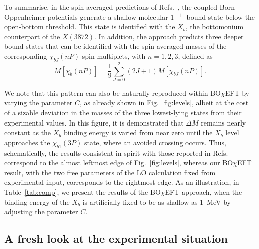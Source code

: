 \documentclass[aps,prd,showpacs,amsmath,twocolumn,superscriptaddress,floatfix,nofootinbib,notitlepage]{revtex4-2}
\newcommand{\be}{\begin{equation}}
\newcommand{\ee}{\end{equation}}
\newcommand{\X}{X(3872)}
\newcommand{\Xb}{X_b}
\newcommand{\BOchiEFT}{BO$\chi$EFT\xspace}
\begin{document}
To summarise, in the spin-averaged predictions of Refs.~\cite{Brambilla:2024imu,Brambilla:2026zfw,Brambilla:2026jqz}, the coupled Born--Oppenheimer potentials generate a shallow molecular $1^{++}$ bound state below the open-bottom threshold. This state is identified with the $\Xb$, the bottomonium counterpart of the $\X$. In addition, the approach predicts three deeper bound states that can be identified with the spin-averaged masses of the corresponding $\chi_{bJ}(nP)$ spin multiplets, with $n=1,2,3$, defined as
\be
\overline{M}[\chi_b(nP)]=\frac{1}{9}
\sum_{J=0}^2(2J+1)M[\chi_{bJ}(nP)].
\label{Mbar}
\ee

We note that this pattern can also be naturally reproduced within \BOchiEFT by varying the parameter $C$, 
as already shown in Fig.~\ref{fig:levels}, 
albeit at the cost of a sizable deviation in the masses of the three lowest-lying states from their experimental values. 
In this figure, it is demonstrated that $\Delta M$ remains nearly constant as the $\Xb$ binding energy is varied from near zero until the $\Xb$ level approaches the $\chi_{b1}(3P)$ state, where an avoided crossing occurs. 
Thus, schematically, the results consistent in spirit with those reported in Refs.~\cite{Brambilla:2024imu,Brambilla:2026zfw,Brambilla:2026jqz} correspond to the almost leftmost edge of Fig.~\ref{fig:levels}, whereas our \BOchiEFT result, with the two free parameters of the LO calculation fixed from experimental input, corresponds to the rightmost edge.
As an illustration, in Table~\ref{tab:comp}, we present the results of the \BOchiEFT approach,
when the binding energy of the $\Xb$ is artificially fixed to be as shallow as 1~MeV by adjusting the parameter $C$. 

\subsection{A fresh look at the experimental situation}
\label{sec:exp}
\end{document}
